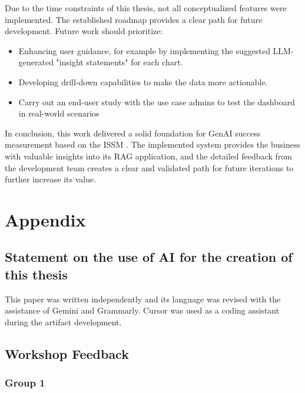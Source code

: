 \documentclass[
	english,
	ruledheaders=section,%
	class=report,%
	thesis={type=bachelor},%
	accentcolor=1b,%
	custommargins=true,%
	marginpar=false,%
	parskip=half-,%
	fontsize=11pt,%
	DIV=14,
]{tudapub}
\begin{document}
Due to the time constraints of this thesis, not all conceptualized features were implemented. The established roadmap provides a clear path for future development. Future work should prioritize:
\begin{itemize}
    \item Enhancing user guidance, for example by implementing the suggested LLM-generated "insight statements" for each chart.
    \item Developing drill-down capabilities to make the data more actionable.
    \item Carry out an end-user study with the use case admins to test the dashboard in real-world scenarios
\end{itemize}

In conclusion, this work delivered a solid foundation for GenAI success measurement based on the ISSM \parencite{DeloneMcLean2003ISSuccessTenYearUpdate}. The implemented system provides the business with valuable insights into its RAG application, and the detailed feedback from the development team creates a clear and validated path for future iterations to further increase its value.
\chapter*{Appendix}

\section{Statement on the use of AI for the creation of this thesis}
This paper was written independently and its language was revised with the assistance of Gemini and Grammarly. Cursor was used as a coding assistant during the artifact development.

\section{Workshop Feedback}
\subsection{Group 1}
\end{document}
